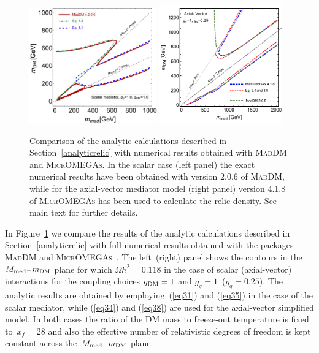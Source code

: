 \documentclass[review]{elsarticle}
\newcommand{\maddm}{\textsc{MadDM}\xspace}
\begin{document}
\begin{center}
\begin{figure}[t!]
\includegraphics[width=0.49\textwidth]{scalar_mediator_omegah2.pdf}
\includegraphics[width=0.47\textwidth]{AV_comparison2.pdf} 
\caption{Comparison of the analytic calculations described in Section~\ref{analyticrelic}  with numerical results obtained with \maddm and \textsc{MicrOMEGAs}. In the scalar case (left panel) the exact numerical results have been obtained with version 2.0.6 of \maddm, while for the axial-vector mediator model (right panel)
version 4.1.8 of \textsc{MicrOMEGAs} has been used to calculate the relic density. See main text for further details.}
\label{fig:analcalc}
\end{figure}
\end{center}

In Figure~\ref{fig:analcalc} we compare the results of the analytic calculations described in Section~\ref{analyticrelic}  with full numerical results obtained with the packages \maddm and \textsc{MicrOMEGAs}~\cite{Belanger:2014vza}. The left~(right) panel shows the contours in the $M_{\rm med}$--$m_{\rm DM}$ plane for which $\Omega h^2 = 0.118$ in the case of scalar (axial-vector) interactions for the coupling choices $g_{\rm DM} = 1$ and $g_q = 1$~($g_q = 0.25$). The analytic results are obtained by employing~(\ref{eq31}) and (\ref{eq35}) in the case of the scalar mediator, while (\ref{eq34}) and (\ref{eq38}) are used for the axial-vector simplified model. In both cases the ratio of the DM mass to freeze-out temperature is fixed to~$x_f = 28$ and also the effective number of relativistic degrees of freedom is kept constant across the~$M_{\rm med}$--$m_{\rm DM}$ plane.
\end{document}
